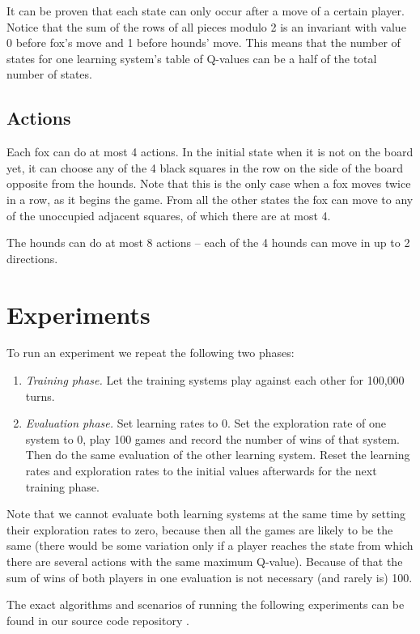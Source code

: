 \documentclass[a4paper]{article}
\begin{document}
It can be proven that each state can only occur after a move of a certain
player. Notice that the sum of the rows of all pieces modulo 2 is an invariant
with value 0 before fox's move and 1 before hounds' move. This means that the
number of states for one learning system's table of Q-values can be a half of
the total number of states.

\subsection{Actions}
Each fox can do at most 4 actions. In the initial state when it is not on the
board yet, it can choose any of the 4 black squares in the row on the side of
the board opposite from the hounds. Note that this is the only case when a fox
moves twice in a row, as it begins the game. From all the other states the fox
can move to any of the unoccupied adjacent squares, of which there are at most
4.

The hounds can do at most 8 actions -- each of the 4 hounds can move in up to 2
directions.

\section{Experiments}
To run an experiment we repeat the following two phases:
\begin{enumerate}
    \item {\em Training phase.} Let the training systems play against each other for
        100,000 turns.
    \item {\em Evaluation phase.} Set learning rates to 0. Set the exploration
        rate of one system to 0, play 100 games and record the number of wins
        of that system. Then do the same evaluation of the other learning
        system. Reset the learning rates and exploration rates to the initial
        values afterwards for the next training phase.
\end{enumerate}

Note that we cannot evaluate both learning systems at the same time by setting
their exploration rates to zero, because then all the games are likely to be
the same (there would be some variation only if a player reaches the state from
which there are several actions with the same maximum Q-value). Because of that
the sum of wins of both players in one evaluation is not necessary (and rarely
is) 100.

The exact algorithms and scenarios of running the following experiments can be
found in our source code repository \cite{github}.
\end{document}
